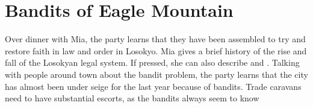 \section{Bandits of Eagle Mountain}

Over dinner with Mia, the party learns that they have been assembled to try and restore faith in law and order in Losokyo. Mia gives a brief history of the rise and fall of the Losokyan legal system. If pressed, she can also describe  and .
Talking with people around town about the bandit problem, the party learns that the city has almost been under seige for the last year because of bandits. Trade caravans need to have substantial escorts, as the bandits always seem to know 
